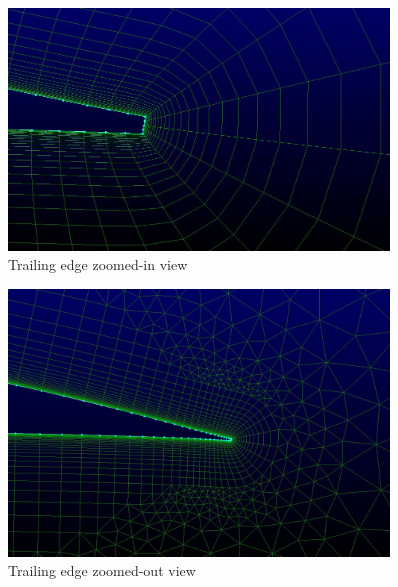 \begin{figure}[H]
	\centering
	\includegraphics[width=0.9\textwidth]{general_images/TE2}
	\caption{Trailing edge zoomed-in view}
\label{fig:TE}
\end{figure}

\begin{figure}[H]
	\centering
	\includegraphics[width=0.9\textwidth]{general_images/TE1}
	\caption{Trailing edge zoomed-out view}
\label{fig:TE}
\end{figure}

